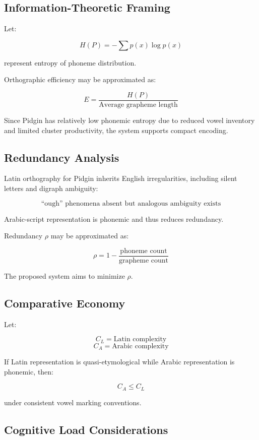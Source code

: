 \documentclass[12pt]{article}
\begin{document}
\subsection{Information-Theoretic Framing}

Let:

\[
H(P) = -\sum p(x)\log p(x)
\]

represent entropy of phoneme distribution.

Orthographic efficiency may be approximated as:

\[
E = \frac{H(P)}{\text{Average grapheme length}}
\]

Since Pidgin has relatively low phonemic entropy due to reduced vowel inventory and limited cluster productivity, the system supports compact encoding.

\subsection{Redundancy Analysis}

Latin orthography for Pidgin inherits English irregularities, including silent letters and digraph ambiguity:

\[
\text{“ough” phenomena absent but analogous ambiguity exists}
\]

Arabic-script representation is phonemic and thus reduces redundancy.

Redundancy \( \rho \) may be approximated as:

\[
\rho = 1 - \frac{\text{phoneme count}}{\text{grapheme count}}
\]

The proposed system aims to minimize \( \rho \).

\subsection{Comparative Economy}

Let:

\[
C_L = \text{Latin complexity}
\]
\[
C_A = \text{Arabic complexity}
\]

If Latin representation is quasi-etymological while Arabic representation is phonemic, then:

\[
C_A \leq C_L
\]

under consistent vowel marking conventions.

\subsection{Cognitive Load Considerations}
\end{document}
